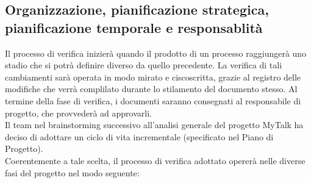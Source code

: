 \subsection{Organizzazione, pianificazione strategica, pianificazione temporale e responsablità}
Il processo di verifica inizierà quando il prodotto di un processo raggiungerà uno stadio che si potrà definire diverso da quello precedente. La verifica di tali cambiamenti sarà operata in modo mirato e ciscoscritta, grazie al registro delle modifiche che verrà complilato durante lo stilamento del documento stesso. Al termine della fase di verifica, i documenti saranno consegnati al responsabile di progetto, che provvederà ad approvarli.\\
Il team nel brainstorming successivo all'analisi generale del progetto MyTalk ha deciso di adottare un ciclo di vita incrementale (specificato nel Piano di Progetto).\\
Coerentemente a tale scelta, il processo di verifica adottato opererà nelle diverse fasi del progetto nel modo seguente: \\
